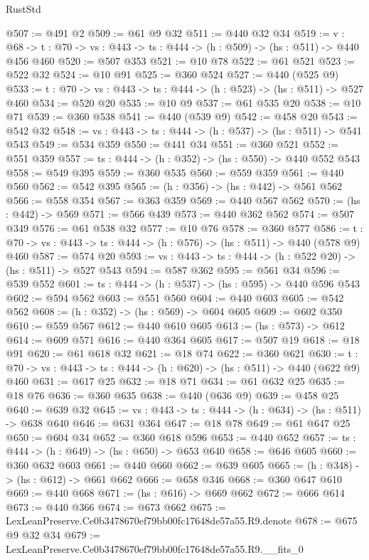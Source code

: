 \begin{lexlean}{RustStd}
\begin{coremodule}
@507 := @491 @2
@509 := @61 @9 @32
@511 := @440 @32 @34
@519 := {v : @68} ->
  {t : @70} -> {vs : @443} -> {ts : @444} -> (h : @509) -> (hs : @511) -> @440 @456 @460
@520 := @507 @353
@521 := @10 @78
@522 := @61 @521
@523 := @522 @32
@524 := @10 @91
@525 := @360 @524
@527 := @440 (@525 @9)
@533 := {t : @70} -> {vs : @443} -> {ts : @444} -> (h : @523) -> (hs : @511) -> @527 @460
@534 := @520 @20
@535 := @10 @9
@537 := @61 @535 @20
@538 := @10 @71
@539 := @360 @538
@541 := @440 (@539 @9)
@542 := @458 @20
@543 := @542 @32
@548 := {vs : @443} -> {ts : @444} -> (h : @537) -> (hs : @511) -> @541 @543
@549 := @534 @359
@550 := @441 @34
@551 := @360 @521
@552 := @551 @359
@557 := {ts : @444} -> (h : @352) -> (hs : @550) -> @440 @552 @543
@558 := @549 @395
@559 := @360 @535
@560 := @559 @359
@561 := @440 @560
@562 := @542 @395
@565 := (h : @356) -> (hs : @442) -> @561 @562
@566 := @558 @354
@567 := @363 @359
@569 := @440 @567 @562
@570 := (hs : @442) -> @569
@571 := @566 @439
@573 := @440 @362 @562
@574 := @507 @349
@576 := @61 @538 @32
@577 := @10 @76
@578 := @360 @577
@586 := {t : @70} -> {vs : @443} -> {ts : @444} -> (h : @576) -> (hs : @511) -> @440 (@578 @9) @460
@587 := @574 @20
@593 := {vs : @443} -> {ts : @444} -> (h : @522 @20) -> (hs : @511) -> @527 @543
@594 := @587 @362
@595 := @561 @34
@596 := @539 @552
@601 := {ts : @444} -> (h : @537) -> (hs : @595) -> @440 @596 @543
@602 := @594 @562
@603 := @551 @560
@604 := @440 @603
@605 := @542 @562
@608 := (h : @352) -> (hs : @569) -> @604 @605
@609 := @602 @350
@610 := @559 @567
@612 := @440 @610 @605
@613 := (hs : @573) -> @612
@614 := @609 @571
@616 := @440 @364 @605
@617 := @507 @19
@618 := @18 @91
@620 := @61 @618 @32
@621 := @18 @74
@622 := @360 @621
@630 := {t : @70} -> {vs : @443} -> {ts : @444} -> (h : @620) -> (hs : @511) -> @440 (@622 @9) @460
@631 := @617 @25
@632 := @18 @71
@634 := @61 @632 @25
@635 := @18 @76
@636 := @360 @635
@638 := @440 (@636 @9)
@639 := @458 @25
@640 := @639 @32
@645 := {vs : @443} -> {ts : @444} -> (h : @634) -> (hs : @511) -> @638 @640
@646 := @631 @364
@647 := @18 @78
@649 := @61 @647 @25
@650 := @604 @34
@652 := @360 @618 @596
@653 := @440 @652
@657 := {ts : @444} -> (h : @649) -> (hs : @650) -> @653 @640
@658 := @646 @605
@660 := @360 @632 @603
@661 := @440 @660
@662 := @639 @605
@665 := (h : @348) -> (hs : @612) -> @661 @662
@666 := @658 @346
@668 := @360 @647 @610
@669 := @440 @668
@671 := (hs : @616) -> @669 @662
@672 := @666 @614
@673 := @440 @366
@674 := @673 @662
@675 := LexLeanPreserve.Ce0b3478670ef79bb00fc17648de57a55.R9.denote
@678 := @675 @9 @32 @34
@679 := LexLeanPreserve.Ce0b3478670ef79bb00fc17648de57a55.R9.__fits_0

\end{coremodule}
\end{lexlean}
